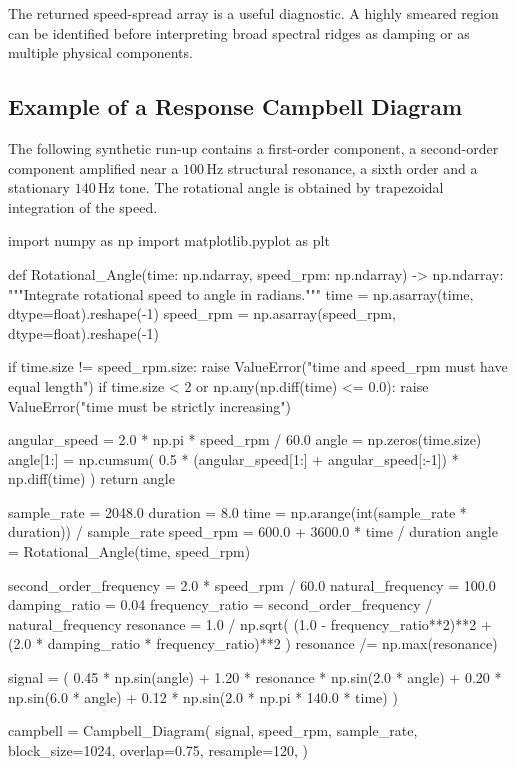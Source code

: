 The returned speed-spread array is a useful diagnostic. A highly smeared region
can be identified before interpreting broad spectral ridges as damping or as
multiple physical components.

\subsection{Example of a Response Campbell Diagram}

The following synthetic run-up contains a first-order component, a second-order
component amplified near a $ 100\,\mathrm{Hz} $ structural resonance, a sixth
order and a stationary $ 140\,\mathrm{Hz} $ tone. The rotational angle is
obtained by trapezoidal integration of the speed.

\begin{python}
import numpy as np
import matplotlib.pyplot as plt


def Rotational_Angle(time: np.ndarray,
                     speed_rpm: np.ndarray) -> np.ndarray:
    """Integrate rotational speed to angle in radians."""
    time = np.asarray(time, dtype=float).reshape(-1)
    speed_rpm = np.asarray(speed_rpm, dtype=float).reshape(-1)

    if time.size != speed_rpm.size:
        raise ValueError("time and speed_rpm must have equal length")
    if time.size < 2 or np.any(np.diff(time) <= 0.0):
        raise ValueError("time must be strictly increasing")

    angular_speed = 2.0 * np.pi * speed_rpm / 60.0
    angle = np.zeros(time.size)
    angle[1:] = np.cumsum(
        0.5
        * (angular_speed[1:] + angular_speed[:-1])
        * np.diff(time)
    )
    return angle


sample_rate = 2048.0
duration = 8.0
time = np.arange(int(sample_rate * duration)) / sample_rate
speed_rpm = 600.0 + 3600.0 * time / duration
angle = Rotational_Angle(time, speed_rpm)

second_order_frequency = 2.0 * speed_rpm / 60.0
natural_frequency = 100.0
damping_ratio = 0.04
frequency_ratio = second_order_frequency / natural_frequency
resonance = 1.0 / np.sqrt(
    (1.0 - frequency_ratio**2)**2
    + (2.0 * damping_ratio * frequency_ratio)**2
)
resonance /= np.max(resonance)

signal = (
    0.45 * np.sin(angle)
    + 1.20 * resonance * np.sin(2.0 * angle)
    + 0.20 * np.sin(6.0 * angle)
    + 0.12 * np.sin(2.0 * np.pi * 140.0 * time)
)

campbell = Campbell_Diagram(
    signal,
    speed_rpm,
    sample_rate,
    block_size=1024,
    overlap=0.75,
    resample=120,
)


\end{python}
